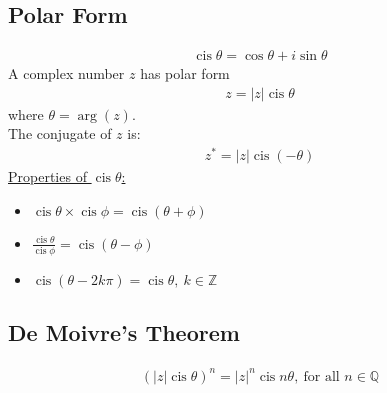 \documentclass[10pt, a4paper, titlepage]{article}
\DeclareMathOperator\cis{cis}
\begin{document}
\begin{multicols*}{3}
	\subsection{Polar Form}
	\begin{align}
		\cis{\theta}=\cos{\theta}+i\sin{\theta}
	\end{align}
	A complex number $z$ has polar form
	\begin{align}
		z=|z|\cis{\theta}
	\end{align}
	where $\theta = \arg({z})$.\\
	The conjugate of $z$ is:
	\begin{align}
		z^*=|z|\cis{(-\theta)}
	\end{align}
	\underline{Properties of $\cis{\theta}$:}
	\begin{itemize}
		\item $\cis{\theta}\times \cis{\phi}=\cis{(\theta +\phi )}$
		\item $\frac{\cis{\theta}}{\cis{\phi}}=\cis{(\theta -\phi )}$
		\item $\cis{(\theta -2k\pi )}=\cis{\theta},\ k\in \mathbb{Z}$
	\end{itemize}

	\dotfill
	\subsection{De Moivre's Theorem}
	\begin{align}
		(|z|\cis{\theta})^n=|z|^n\cis{n\theta},\ \text{for all }n\in \mathbb{Q}
	\end{align}
	\dotfill

\end{multicols*}
\end{document}
